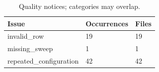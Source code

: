\begin{table}[htbp]
\centering
\caption{Quality notices; categories may overlap.}
\label{tab:data-quality}
\begin{tabular}{lll}
\hline
Issue & Occurrences & Files \\
\hline
invalid\_row & 19 & 19 \\
missing\_sweep & 1 & 1 \\
repeated\_configuration & 42 & 42 \\
\hline
\end{tabular}
\end{table}
